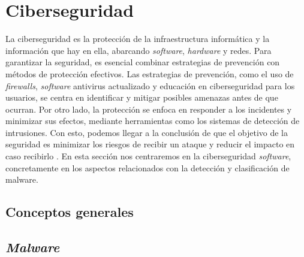 \subsection{}
\label{subsec:}



\subsubsection{}
\label{subsubsec:}








\section{Ciberseguridad}
\label{sec:ciberseguridad}

La ciberseguridad es la protección de la infraestructura informática y la información que hay en ella, abarcando \textit{software}, \textit{hardware} y redes. Para garantizar la seguridad, es esencial combinar estrategias de prevención con métodos de protección efectivos. Las estrategias de prevención, como el uso de \textit{firewalls}, \textit{software} antivirus actualizado y educación en ciberseguridad para los usuarios, se centra en identificar y mitigar posibles amenazas antes de que ocurran. Por otro lado, la protección se enfoca en responder a los incidentes y minimizar sus efectos, mediante herramientas como los sistemas de detección de intrusiones. Con esto, podemos llegar a la conclusión de que el objetivo de la seguridad es minimizar los riesgos de recibir un ataque y reducir el impacto en caso recibirlo \cite{ciberseguridad_def}. En esta sección nos centraremos en la ciberseguridad \textit{software}, concretamente en los aspectos relacionados con la detección y clasificación de malware.

\subsection{Conceptos generales}
\label{subsec:ciberseguridad_general}

\subsection{\textit{Malware}}
\label{subsec:malware}

